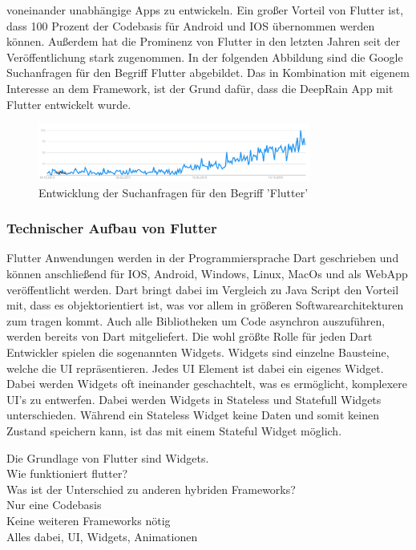 voneinander unabhängige Apps zu entwickeln. 
Ein großer Vorteil von Flutter ist, dass 100 Prozent der Codebasis für Android und IOS übernommen werden können. Außerdem hat die Prominenz von 
Flutter in den letzten Jahren seit der Veröffentlichung stark zugenommen. In der folgenden Abbildung sind die Google Suchanfragen für den Begriff 
Flutter abgebildet.  Das in Kombination mit eigenem Interesse an dem Framework, ist der Grund dafür, dass die DeepRain App mit Flutter entwickelt wurde.
\begin{figure}[H]
 \centering
 \includegraphics[width=0.8\textwidth,angle=0]{abb/flutter_google_trends}
 \caption[Entwicklung von Flutter]{Entwicklung der Suchanfragen für den Begriff 'Flutter'}
\label{fig:flutter_google_trends}
\end{figure}

\subsubsection{Technischer Aufbau von Flutter}
Flutter Anwendungen werden in der Programmiersprache Dart geschrieben und können anschließend für IOS, Android, Windows, Linux, MacOs und als WebApp 
veröffentlicht werden. Dart bringt dabei im Vergleich zu Java Script den Vorteil mit, dass es objektorientiert ist, was vor allem in größeren 
Softwarearchitekturen zum tragen kommt. Auch alle Bibliotheken um Code asynchron auszuführen, werden bereits von Dart mitgeliefert. 
Die wohl größte Rolle für jeden Dart Entwickler spielen die sogenannten Widgets. Widgets sind einzelne Bausteine, welche die UI repräsentieren. 
Jedes UI Element ist dabei ein eigenes Widget. Dabei werden Widgets oft ineinander geschachtelt, was es ermöglicht, komplexere UI’s zu entwerfen. 
Dabei werden Widgets in Stateless und Statefull Widgets unterschieden. Während ein Stateless Widget keine Daten und somit keinen Zustand speichern kann, 
ist das mit einem Stateful Widget möglich.

Die Grundlage von Flutter sind Widgets. \\
Wie funktioniert flutter?   \\
Was ist der Unterschied zu anderen hybriden Frameworks?  \\ 
Nur eine Codebasis \\
Keine weiteren Frameworks nötig\\
Alles dabei, UI, Widgets, Animationen\\

